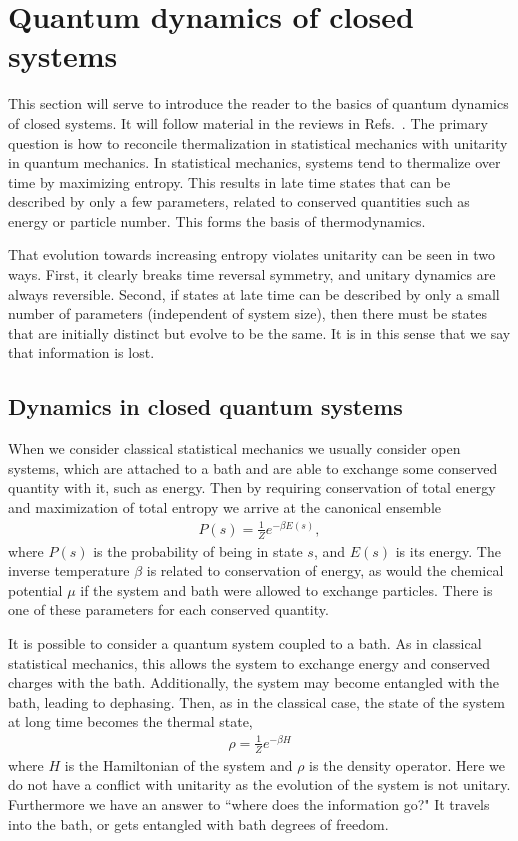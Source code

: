 \documentclass[a4paper,11pt]{article}
\renewcommand{\th}[1]{\frac{1}{#1}}
\begin{document}
\section{Quantum dynamics of closed systems} \label{sec:dyn}

This section will serve to introduce the reader to the basics of quantum dynamics of closed systems. It will follow material in the reviews in Refs.~\cite{Cazalilla2010, PolkovnikovClosed, Nandkishore14, GogolinStatMech}. The primary question is how to reconcile thermalization in statistical mechanics with unitarity in quantum mechanics. In statistical mechanics, systems tend to thermalize over time by maximizing entropy. This results in late time states that can be described by only a few parameters, related to conserved quantities such as energy or particle number. This forms the basis of thermodynamics. 

That evolution towards increasing entropy violates unitarity can be seen in two ways. First, it clearly breaks time reversal symmetry, and unitary dynamics are always reversible. Second, if states at late time can be described by only a small number of parameters (independent of system size), then there must be states that are initially distinct but evolve to be the same. It is in this sense that we say that information is lost.

\subsection{Dynamics in closed quantum systems} \label{sub:closed}

When we consider classical statistical mechanics we usually consider open systems, which are attached to a bath and are able to exchange some conserved quantity with it, such as energy. Then by requiring conservation of total energy and maximization of total entropy we arrive at the canonical ensemble
\begin{align}
P(s)=\th{Z}e^{-\beta E(s)},
\end{align}
where $P(s)$ is the probability of being in state $s$, and $E(s)$ is its energy. The inverse temperature $\beta$ is related to conservation of energy, as would the chemical potential $\mu$ if the system and bath were allowed to exchange particles. There is one of these parameters for each conserved quantity.

It is possible to consider a quantum system coupled to a bath. As in classical statistical mechanics, this allows the system to exchange energy and conserved charges with the bath. Additionally, the system may become entangled with the bath, leading to dephasing. Then, as in the classical case, the state of the system at long time becomes the thermal state,
\begin{align}
\rho = \th{Z}e^{-\beta H}
\end{align}
where $H$ is the Hamiltonian of the system and $\rho$ is the density operator.
Here we do not have a conflict with unitarity as the evolution of the system is not unitary. Furthermore we have an answer to ``where does the information go?" It travels into the bath, or gets entangled with bath degrees of freedom. 
\end{document}
